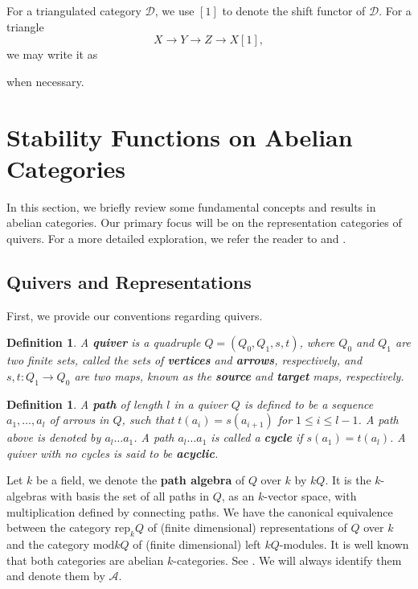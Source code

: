 \documentclass[a4paper,12pt]{amsart}
\newtheorem{definition}[theorem]{Definition}
\newcommand{\mmod}{\mathrm{mod}}
\newcommand{\rep}{\mathrm{rep}}
\begin{document}
    For a triangulated category $\mathcal{D}$, we use $[1]$ to denote the shift functor of $\mathcal{D}$. For a triangle
    \[X\rightarrow Y\rightarrow Z\rightarrow X[1],\]
    we may write it as
    \begin{center}
    \end{center}
    when necessary.
\section{Stability Functions on Abelian Categories}
In this section, we briefly review some fundamental concepts and results in abelian categories. Our primary focus will be on the representation categories of quivers. For a more detailed exploration, we refer the reader to \cite{BT2012} and \cite{Rei2002}. 

\subsection{Quivers and Representations}
First, we provide our conventions regarding quivers.
\begin{definition}
    A \textbf{quiver} is a quadruple $Q=(Q_0,Q_1,s,t)$, where $Q_0$ and $Q_1$ are two finite sets, called the sets of \textbf{vertices} and \textbf{arrows}, respectively, and $s,t:Q_1\rightarrow Q_0$ are two maps, known as the \textbf{source} and \textbf{target} maps, respectively.
\end{definition}
\begin{definition}
    A \textbf{path} of length $l$ in a quiver $Q$ is defined to be a sequence $a_1,\dots,a_l$ of arrows in $Q$, such that $t(a_i)=s(a_{i+1})$ for $1\leqslant i\leqslant l-1$. A path above is denoted by $a_l\dots a_1$. A path $a_l\dots a_1$ is called a \textbf{cycle} if $s(a_1)=t(a_l)$. A quiver with no cycles is said to be \textbf{acyclic}.
\end{definition}
Let $k$ be a field, we denote the \textbf{path algebra} of $Q$ over $k$ by $kQ$. It is the $k$-algebras with basis the set of all paths in $Q$, as an $k$-vector space, with multiplication defined by connecting paths. We have the canonical equivalence between the category $\rep_kQ$ of (finite dimensional) representations of $Q$ over $k$ and the category $\mmod kQ$ of (finite dimensional) left $kQ$-modules. It is well known that both categories are abelian $k$-categories. See \cite{ASS2006}. We will always identify them and denote them by $\mathcal{A}$.
\end{document}
